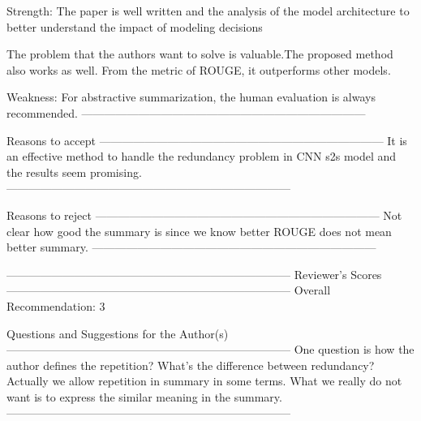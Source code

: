 Strength:
The paper is well written and the analysis of the model architecture to better understand the impact of modeling decisions

The problem that the authors want to solve is valuable.The proposed method also works as well. From the metric of ROUGE, it outperforms other models.

Weakness:
For abstractive summarization, the human evaluation is always recommended.
---------------------------------------------------------------------------


Reasons to accept
---------------------------------------------------------------------------
It is an effective method to handle the redundancy problem in CNN s2s model and the results seem promising.
---------------------------------------------------------------------------


Reasons to reject
---------------------------------------------------------------------------
Not clear how good the summary is since we know better ROUGE does not mean better summary.
---------------------------------------------------------------------------


---------------------------------------------------------------------------
Reviewer's Scores
---------------------------------------------------------------------------
                  Overall Recommendation: 3

Questions and Suggestions for the Author(s)
---------------------------------------------------------------------------
One question is how the author defines the repetition? What's the difference between redundancy? 
Actually we allow repetition in summary in some terms. What we really do not want is to express the similar meaning in the summary.
---------------------------------------------------------------------------
